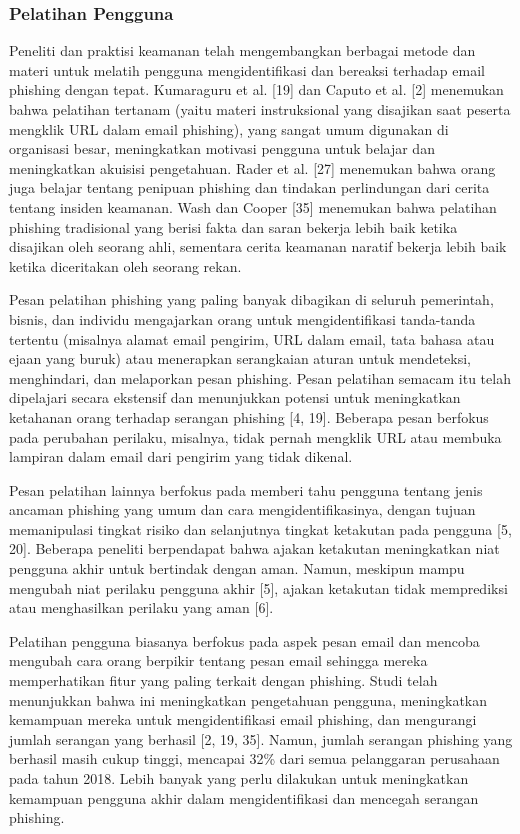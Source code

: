 \documentclass[lettersize,journal]{IEEEtran}
\begin{document}
\subsubsection{Pelatihan Pengguna}
Peneliti dan praktisi keamanan telah mengembangkan berbagai metode dan materi
untuk melatih pengguna mengidentifikasi dan bereaksi terhadap email phishing
dengan tepat. Kumaraguru et al. [19] dan Caputo et al. [2] menemukan bahwa
pelatihan tertanam (yaitu materi instruksional yang disajikan saat peserta
mengklik URL dalam email phishing), yang sangat umum digunakan di organisasi
besar, meningkatkan motivasi pengguna untuk belajar dan meningkatkan akuisisi
pengetahuan. Rader et al. [27] menemukan bahwa orang juga belajar tentang
penipuan phishing dan tindakan perlindungan dari cerita tentang insiden
keamanan. Wash dan Cooper [35] menemukan bahwa pelatihan phishing tradisional
yang berisi fakta dan saran bekerja lebih baik ketika disajikan oleh seorang
ahli, sementara cerita keamanan naratif bekerja lebih baik ketika diceritakan
oleh seorang rekan.

Pesan pelatihan phishing yang paling banyak dibagikan di seluruh pemerintah,
bisnis, dan individu mengajarkan orang untuk mengidentifikasi tanda-tanda
tertentu (misalnya alamat email pengirim, URL dalam email, tata bahasa atau
ejaan yang buruk) atau menerapkan serangkaian aturan untuk mendeteksi,
menghindari, dan melaporkan pesan phishing. Pesan pelatihan semacam itu telah
dipelajari secara ekstensif dan menunjukkan potensi untuk meningkatkan
ketahanan orang terhadap serangan phishing [4, 19]. Beberapa pesan berfokus
pada perubahan perilaku, misalnya, tidak pernah mengklik URL atau membuka
lampiran dalam email dari pengirim yang tidak dikenal.

Pesan pelatihan lainnya berfokus pada memberi tahu pengguna tentang jenis
ancaman phishing yang umum dan cara mengidentifikasinya, dengan tujuan
memanipulasi tingkat risiko dan selanjutnya tingkat ketakutan pada pengguna [5,
    20]. Beberapa peneliti berpendapat bahwa ajakan ketakutan meningkatkan niat
pengguna akhir untuk bertindak dengan aman. Namun, meskipun mampu mengubah niat
perilaku pengguna akhir [5], ajakan ketakutan tidak memprediksi atau
menghasilkan perilaku yang aman [6].

Pelatihan pengguna biasanya berfokus pada aspek pesan email dan mencoba
mengubah cara orang berpikir tentang pesan email sehingga mereka memperhatikan
fitur yang paling terkait dengan phishing. Studi telah menunjukkan bahwa ini
meningkatkan pengetahuan pengguna, meningkatkan kemampuan mereka untuk
mengidentifikasi email phishing, dan mengurangi jumlah serangan yang berhasil
  [2, 19, 35]. Namun, jumlah serangan phishing yang berhasil masih cukup tinggi,
mencapai 32\% dari semua pelanggaran perusahaan pada tahun 2018. Lebih banyak
yang perlu dilakukan untuk meningkatkan kemampuan pengguna akhir dalam
mengidentifikasi dan mencegah serangan phishing.
\end{document}
